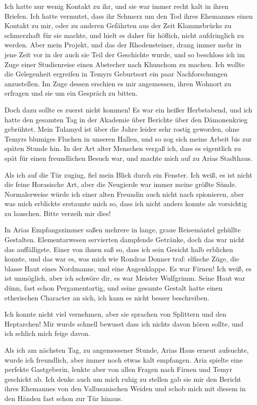 Ich hatte nur wenig Kontakt zu ihr, und sie war immer recht kalt in ihren Briefen. Ich hatte vermutet, dass ihr Schmerz um den Tod ihres Ehemannes einen Kontakt zu mir, oder zu anderen Gefährten aus der Zeit Klammsbrücks zu schmerzhaft für sie machte, und hielt es daher für höflich, nicht aufdringlich zu werden.
Aber mein Projekt, und das der Rhodensteiner, drang immer mehr in jene Zeit vor in der auch sie Teil der Geschichte wurde, und so beschloss ich im Zuge einer Studienreise einen Abstecher nach Khunchom zu machen. Ich wollte die Gelegenheit ergreifen in Temyrs Geburtsort ein paar Nachforschungen anzustellen. Im Zuge dessen erschien es mir angemessen, ihren Wohnort zu erfragen und sie um ein Gespräch zu bitten.

Doch dazu sollte es zuerst nicht kommen! Es war ein heißer Herbstabend, und ich hatte den gesamten Tag in der Akademie über Berichte über den Dämonenkrieg gebrühtet. Mein Tulamyd ist über die Jahre leider sehr rostig geworden, ohne Temyrs blumiges Fluchen in unseren Hallen, und so zog sich meine Arbeit bis zur späten Stunde hin. In der Art alter Menschen vergaß ich, dass es eigentlich zu spät für einen freundlichen Besuch war, und machte mich auf zu Arias Stadthaus.

Als ich auf die Tür zuging, fiel mein Blick durch ein Fenster. Ich weiß, es ist nicht die feine Horasische Art, aber die Neugierde war immer meine größte Sünde. Normalerweise würde ich einer alten Freundin auch nicht nach spionieren, aber was mich erblickte erstaunte mich so, dass ich nicht anders konnte als vorsichtig zu lauschen. Bitte verzeih mir dies!

In Arias Empfangszimmer saßen mehrere in lange, graue Reisemäntel gehüllte Gestalten. Elementarwesen servierten dampfende Getränke, doch das war nicht das auffälligste. Einer von ihnen saß so, dass ich sein Gesicht halb erblicken konnte, und das war es, was mich wie Rondras Donner traf: elfische Züge, die blasse Haut eines Nordmanns, und eine Augenklappe. Es war Firnen! Ich weiß, es ist unmöglich, aber ich schwöre dir, es war Meister Wulfgrimm. Seine Haut war dünn, fast schon Pergamentartig, und seine gesamte Gestalt hatte einen etherischen Character an sich, ich kann es nicht besser beschreiben.

Ich konnte nicht viel vernehmen, aber sie sprachen von Splittern und den Heptarchen! Mir wurde schnell bewusst dass ich nichts davon hören sollte, und ich schlich mich feige davon.

Als ich am nächsten Tag, zu angemessener Stunde, Arias Haus erneut aufsuchte, wurde ich freundlich, aber immer noch etwas kalt empfangen. Aria spielte eine perfekte Gastgeberin, lenkte aber von allen Fragen nach Firnen und Temyr geschickt ab. Ich denke auch um mich ruhig zu stellen gab sie mir den Bericht ihres Ehemannes von den Vallusanischen Weiden und schob mich mit diesem in den Händen fast schon zur Tür hinaus.

